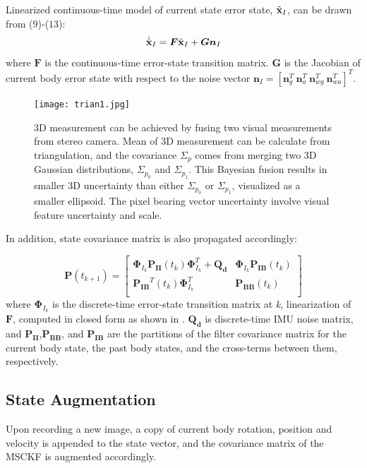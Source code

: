 \documentclass[a4paper, 10pt, conference]{ieeeconf}      %
\begin{document}
 Linearized continuous-time model of  current state error state, $ {{\tilde{\textbf x}}_{I}} $, can be drawn from ($9$)-($13$):
\begin{equation}
{\dot{\tilde{\textbf x}}_{I}} =  \bm F{\tilde{\textbf x}}_{I}+\bm G \bm n_I
\end{equation}
where $ \bm F $ is the continuous-time error-state transition matrix. $ \bm G $ is 
the Jacobian of current body error state with respect to the noise vector  $ \bm n_I = [\bm n_g^T \ \bm n_{a}^T \  \bm n_{wg}^T \ \bm n_{wa}^T]^T $. 


\begin{figure}[thpb]
	\centering
	
	\texttt{[image: trian1.jpg]}
	
	\caption{ 3D measurement can be achieved by fusing two visual measurements from stereo camera. Mean of 3D measurement can be calculate from triangulation, and the covariance $ \Sigma_p $ comes from merging two 3D Gaussian distributions, $ \Sigma_{p_0} $ and $ \Sigma_{p_1} $. This Bayesian fusion results in smaller 3D uncertainty than either $ \Sigma_{p_0} $ or $ \Sigma_{p_1} $, visualized as a smaller  ellipsoid.  The pixel bearing vector uncertainty involve visual feature uncertainty and scale.}
	\label{figurelabel}
\end{figure}

In addition, state covariance matrix is also propagated accordingly:

\begin{equation}
\bm{P}(t_{k+1})= \left[  \begin{matrix} 
 \bm {\Phi}_{I_k}\bm{P_{II}}(t_{k}) \bm {\Phi}_{I_k}^T + \bm {Q_d}  & 
\bm {\Phi}_{I_k}\bm{P_{IB}}(t_{k}) \\
\bm{P_{IB}}^T(t_k) \bm {\Phi}_{I_k}^T & 
\bm{P_{BB}}(t_k)  \\
\end{matrix}   \right] 
\end{equation}
where $ \bm {\Phi}_{I_k} $ is the discrete-time error-state transition matrix at \emph k, linearization of  $ \bm F $, computed in closed form as shown in \cite{li2013high}. $ \bm {Q_d}  $ is discrete-time IMU noise matrix, and $ \bm{P_{II}} $,$ \bm{P_{BB}} $, and
$ \bm{P_{IB}} $ are the partitions of the filter covariance matrix for
the current body state, the past body states, and the cross-terms between
them, respectively.




\subsection{State Augmentation}
Upon recording a new image, a copy of current body rotation, position and velocity is appended
to the state vector, and the covariance matrix of the MSCKF is augmented accordingly.
\end{document}

